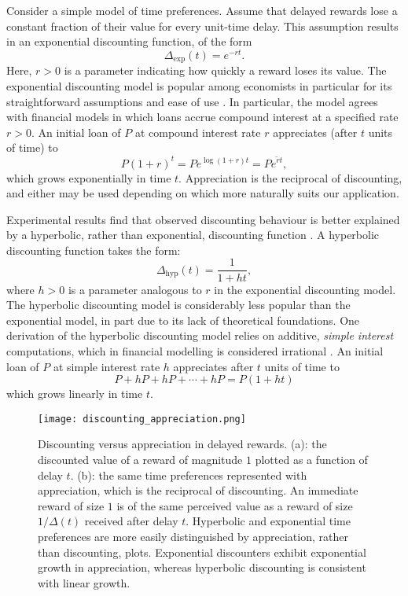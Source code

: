 \documentclass[titlepage, hidelinks, 12pt]{article}
\theoremstyle{plain}
\theoremstyle{remark}
\theoremstyle{definition}
\DeclareMathOperator{\hyp}{hyp}
\begin{document}
Consider a simple model of time preferences.
Assume that delayed rewards lose a constant fraction of their value for every unit-time delay. This assumption 
results in an exponential discounting function, of the form
\begin{equation}
    \Delta_{\exp}(t) = e^{-r t}.
\end{equation}
Here, $r>0$ is a parameter indicating how quickly a reward loses its value. 
The exponential discounting model is popular among economists in particular
for its straightforward assumptions and ease of use \cite{sozou98}. 
In particular, the model 
agrees with financial models in which loans accrue compound interest at a specified rate $r>0$. An initial loan of $P$ at compound interest
rate $r$ appreciates (after $t$ units of time) to 
\begin{equation}
    P(1 + r)^{t} = Pe^{\log(1+r) t} = Pe^{\tilde{r}t},
    \label{eqn:compound_interest}
\end{equation}
which grows exponentially in time $t$. 
Appreciation is the reciprocal of discounting, and either may be used depending on which more naturally suits our application. 


Experimental results find that observed discounting behaviour is better explained
by a hyperbolic, rather than exponential, discounting function \cite{maia09, green04, doyle12}. A hyperbolic discounting function takes
the form:
\begin{equation}
    \Delta_{\hyp}(t) = \frac{1}{1+ht},
\end{equation}
where $h>0$ is a parameter analogous to $r$ in the exponential discounting model. The hyperbolic discounting model is considerably less
popular than the exponential model, in part due to its lack of theoretical foundations. One derivation of the hyperbolic discounting model relies
on additive, \textit{simple interest} computations, which in financial modelling is considered irrational \cite{rachlin06}. An initial loan
of $P$ at simple interest rate $h$ appreciates after $t$ units of time to
\begin{equation}
    P + hP + hP + \cdots + hP = P(1 + ht)
    \label{eqn:simple_interest}
\end{equation}
which grows linearly in time $t$. 

\begin{figure}[H]
    \centering
    \texttt{[image: discounting\_appreciation.png]}
    \caption[Example discounting and corresponding appreciation schedules.]{Discounting versus appreciation in delayed rewards. 
        (a): the discounted value of a reward of magnitude $1$ plotted as a function of delay $t$.  
        (b): the same time preferences represented with appreciation, which is the reciprocal of discounting. An immediate reward of size $1$ is
        of the same perceived value as a reward of size $1/\Delta(t)$ received after delay $t$. 
        Hyperbolic and exponential time preferences are more easily distinguished by appreciation, rather than discounting, plots.
        Exponential discounters exhibit exponential
        growth in appreciation, whereas hyperbolic discounting is consistent with linear growth.}
\end{figure}
\end{document}
